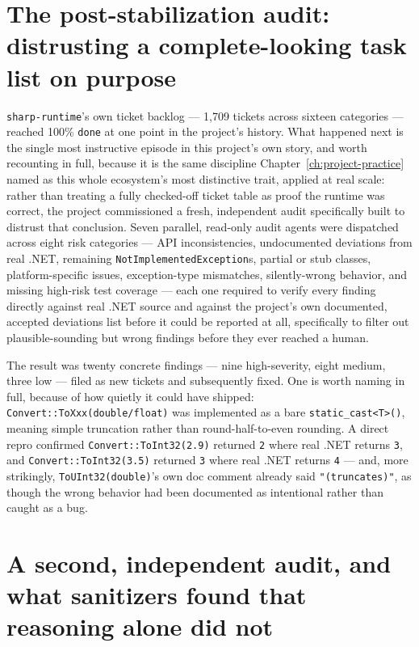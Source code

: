 \section{The post-stabilization audit: distrusting a complete-looking task list on purpose}

\texttt{sharp-runtime}'s own ticket backlog --- 1{,}709 tickets across sixteen categories ---
reached 100\% \texttt{done} at one point in the project's history. What happened next is the
single most instructive episode in this project's own story, and worth recounting in full,
because it is the same discipline Chapter~\ref{ch:project-practice} named as this whole
ecosystem's most distinctive trait, applied at real scale: rather than treating a fully
checked-off ticket table as proof the runtime was correct, the project commissioned a fresh,
independent audit specifically built to distrust that conclusion. Seven parallel, read-only
audit agents were dispatched across eight risk categories --- API inconsistencies,
undocumented deviations from real .NET, remaining \texttt{NotImplementedException}s, partial
or stub classes, platform-specific issues, exception-type mismatches, silently-wrong
behavior, and missing high-risk test coverage --- each one required to verify every finding
directly against real .NET source and against the project's own documented, accepted
deviations list before it could be reported at all, specifically to filter out
plausible-sounding but wrong findings before they ever reached a human.

The result was twenty concrete findings --- nine high-severity, eight medium, three low ---
filed as new tickets and subsequently fixed. One is worth naming in full, because of how
quietly it could have shipped: \texttt{Convert::ToXxx(double/float)} was implemented as a
bare \texttt{static\_cast<T>()}, meaning simple truncation rather than round-half-to-even
rounding. A direct repro confirmed \texttt{Convert::ToInt32(2.9)} returned \texttt{2} where
real .NET returns \texttt{3}, and \texttt{Convert::ToInt32(3.5)} returned \texttt{3} where real
.NET returns \texttt{4} --- and, more strikingly, \texttt{ToUInt32(double)}'s own doc comment
already said \texttt{"(truncates)"}, as though the wrong behavior had been documented as
intentional rather than caught as a bug.

\section{A second, independent audit, and what sanitizers found that reasoning alone did not}

